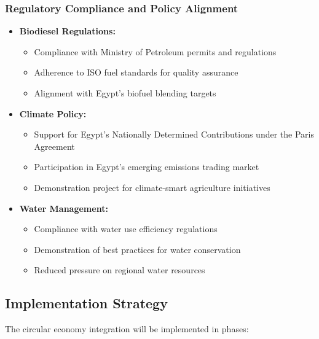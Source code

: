 \subsubsection{Regulatory Compliance and Policy Alignment}
\begin{itemize}
    \item \textbf{Biodiesel Regulations:}
    \begin{itemize}
        \item Compliance with Ministry of Petroleum permits and regulations
        \item Adherence to ISO fuel standards for quality assurance
        \item Alignment with Egypt's biofuel blending targets
    \end{itemize}
    
    \item \textbf{Climate Policy:}
    \begin{itemize}
        \item Support for Egypt's Nationally Determined Contributions under the Paris Agreement
        \item Participation in Egypt's emerging emissions trading market
        \item Demonstration project for climate-smart agriculture initiatives
    \end{itemize}
    
    \item \textbf{Water Management:}
    \begin{itemize}
        \item Compliance with water use efficiency regulations
        \item Demonstration of best practices for water conservation
        \item Reduced pressure on regional water resources
    \end{itemize}
\end{itemize}

\subsection{Implementation Strategy}

The circular economy integration will be implemented in phases:

